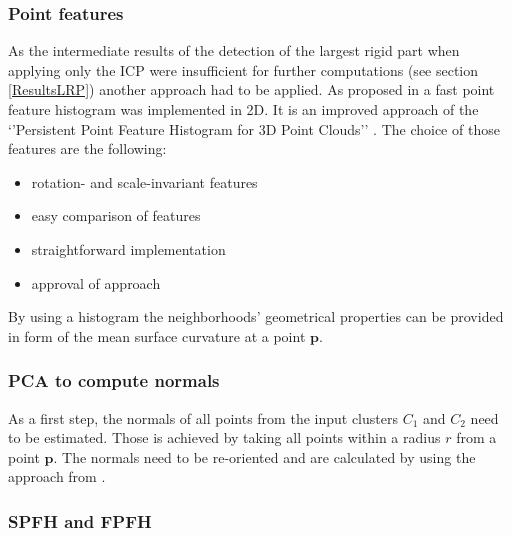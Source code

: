 \subsubsection{Point features}
As the intermediate results of the detection of the largest rigid part when applying only the ICP were insufficient for further computations (see section \ref{ResultsLRP}) another approach had to be applied. As proposed in \cite{Mitra07} a fast point feature histogram \cite{FPFH} was implemented in 2D. It is an improved approach of the `'Persistent Point Feature Histogram for 3D Point Clouds'' \cite{PPFH}. The choice of those features are the following: 
\begin{itemize}
	\item rotation- and scale-invariant features
	\item easy comparison of features
	\item straightforward implementation
	\item approval of approach
\end{itemize}
By using a histogram the neighborhoods' geometrical properties can be provided in form of the mean surface curvature at a point $\boldsymbol{p}$. 

\subsubsection{PCA to compute normals}

As a first step, the normals of all points from the input clusters $C_1$ and $C_2$ need to be estimated. Those is achieved by taking all points within a radius $r$ from a point $\boldsymbol{p}$. The normals need to be re-oriented and are calculated by using the approach from \cite{normals}. 


\subsubsection{SPFH and FPFH}

